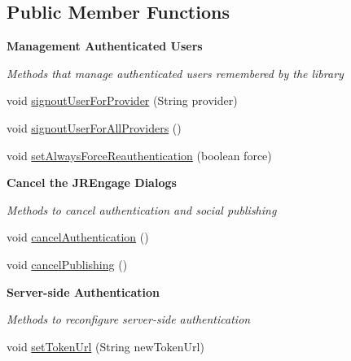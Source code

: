 \subsection*{Public Member Functions}
\begin{Indent}{\bf Management Authenticated Users}\par
{\em \label{_amgrp4247d2361fbfb57c620ed69782a50c95}
 Methods that manage authenticated users remembered by the library }\begin{DoxyCompactItemize}
\item 
void \hyperlink{classcom_1_1janrain_1_1android_1_1engage_1_1_j_r_engage_a85a4829f1caab300e8b01dc47aee638d}{signoutUserForProvider} (String provider)
\item 
void \hyperlink{classcom_1_1janrain_1_1android_1_1engage_1_1_j_r_engage_a7877c06caf812fc767c43352f0509380}{signoutUserForAllProviders} ()
\item 
void \hyperlink{classcom_1_1janrain_1_1android_1_1engage_1_1_j_r_engage_a11ec9d4e5b5d2cbbbd8e02f95d799979}{setAlwaysForceReauthentication} (boolean force)
\end{DoxyCompactItemize}
\end{Indent}
\begin{Indent}{\bf Cancel the JREngage Dialogs}\par
{\em \label{_amgrpd07ee85d05cc5dd13dd0e31682479a39}
 Methods to cancel authentication and social publishing }\begin{DoxyCompactItemize}
\item 
void \hyperlink{classcom_1_1janrain_1_1android_1_1engage_1_1_j_r_engage_a5d37932565edbaf3d879f5848a7bc889}{cancelAuthentication} ()
\item 
void \hyperlink{classcom_1_1janrain_1_1android_1_1engage_1_1_j_r_engage_a45445132f9f15aa224c19e11bec26982}{cancelPublishing} ()
\end{DoxyCompactItemize}
\end{Indent}
\begin{Indent}{\bf Server-\/side Authentication}\par
{\em \label{_amgrp1fc6cae7bdf84f91a0bad45f5891f15e}
 Methods to reconfigure server-\/side authentication }\begin{DoxyCompactItemize}
\item 
void \hyperlink{classcom_1_1janrain_1_1android_1_1engage_1_1_j_r_engage_a9cae37926c51b92a0d934b65cd14829c}{setTokenUrl} (String newTokenUrl)
\end{DoxyCompactItemize}
\end{Indent}
